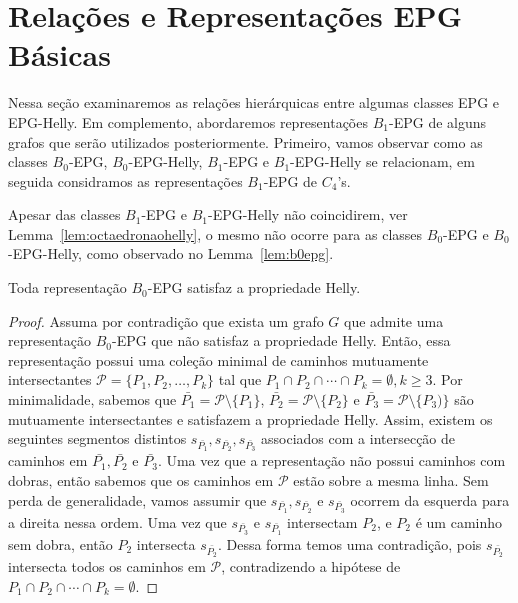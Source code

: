 \section{Relações e Representações EPG Básicas}

Nessa seção examinaremos as relações hierárquicas entre algumas classes EPG e EPG-Helly. Em complemento, abordaremos representações $B_1$-EPG de alguns grafos que serão utilizados posteriormente. Primeiro, vamos observar como as classes $B_0$-EPG, $B_0$-EPG-Helly, $B_1$-EPG e $B_1$-EPG-Helly se relacionam, em seguida considramos as representações $B_1$-EPG de $C_4$'s.

Apesar das classes  $B_1$-EPG e $ B_1$-EPG-Helly não coincidirem, ver Lemma~\ref{lem:octaedronaohelly}, o mesmo não ocorre para as classes $ B_0$-EPG e $ B_0$-EPG-Helly, como observado no Lemma~\ref{lem:b0epg}.

\begin {lema} \label{lem:b0epg}
Toda representação $ B_0$-EPG satisfaz a propriedade Helly.
\end {lema}
\begin {proof}
Assuma por contradição que exista um grafo $G$ que admite uma representação $ B_0$-EPG que não satisfaz a propriedade Helly. Então, essa representação possui uma coleção minimal de caminhos mutuamente intersectantes $ \mathcal{P} = \{P_{1}, P_{2}, \ldots, P_{k} \} $ tal que $ P_{1} \cap P_{2} \cap \cdots \cap P_{k} = \emptyset, k \geq 3. $
Por minimalidade, sabemos que  $ \bar{P_1} = \mathcal{P} \setminus \{P_1 \}$, $ \bar {P_2} = \mathcal{P} \setminus \{P_2 \} $ e $ \bar {P_3 } = \mathcal{P} \setminus \{P_3) \} $ são mutuamente intersectantes e satisfazem a propriedade Helly.
Assim, existem os seguintes segmentos distintos $ s_{\bar{P_1}}, s_{\bar {P_2}}, s_{\bar {P_3}}$ associados com a intersecção de caminhos em $ \bar {P_1},  \bar {P_2} $ e $ \bar {P_3} $. Uma vez que a representação não possui caminhos com dobras, então sabemos que os caminhos em  $ \mathcal{P}$ estão sobre a mesma linha.
Sem perda de generalidade, vamos assumir que  $ s_{ \bar {P_1}}, s_{ \bar {P_2}}$ e $ s_{ \bar {P_3}}$ ocorrem da esquerda para a direita nessa ordem. Uma vez que $ s_{\bar {P_3}}$ e $ s_{\bar {P_1}}$ intersectam $ P_2 $, e $ P_2 $ é um caminho sem dobra, então $ P_2$ intersecta $ s_{\bar {P_2}}$. Dessa forma temos uma contradição, pois $ s_{\bar {P_2}} $ intersecta todos os caminhos em $ \mathcal{P}$, contradizendo a hipótese de $ P_1 \cap P_2 \cap \cdots \cap P_k = \emptyset $.
\end {proof}

